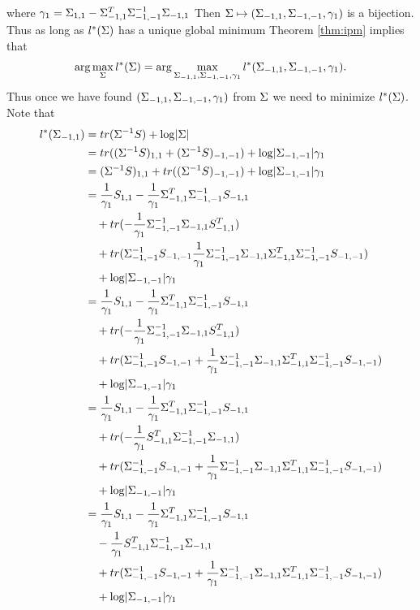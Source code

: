 \documentclass[12pt, leqno]{article}
\providecommand{\abs}[1]{\lvert#1\rvert}
\def\s{\ensuremath\Sigma}
\begin{document}
where $\gamma_1 = \s_{1,1} - \s_{-1,1}^T \s_{-1,-1}^{-1} \s_{-1,1}$
Then $\s \mapsto (\s_{-1,1},\s_{-1,-1},\gamma_1)$ is a bijection. Thus
as long as $l^*(\s)$ has a unique global minimum Theorem \ref{thm:ipm}
implies that 
\[
\arg\max_{\s} l^*(\s) = \arg\max_{\s_{-1,1},\s_{-1,-1},\gamma_1}
l^*(\s_{-1,1},\s_{-1,-1},\gamma_1).
\]
Thus once we have found $(\s_{-1,1},\s_{-1,-1},\gamma_1)$ from $\s$ we
need to minimize $l^*(\s)$. Note that 
\begin{align*}
l^*(\s_{-1,1}) &= tr(\s^{-1} S) + \log \abs{\s} \\
&= tr((\s^{-1} S)_{1,1} + (\s^{-1} S)_{-1,-1}) + \log \abs{\s_{-1,-1}}
  \gamma_1 \\
&= (\s^{-1} S)_{1,1} + tr((\s^{-1} S)_{-1,-1}) + \log \abs{\s_{-1,-1}}
  \gamma_1 \\
&= \frac{1}{\gamma_1} S_{1,1} -\frac{1}{\gamma_1} \s_{-1,1}^T \s_{-1,-1}^{-1}
  S_{-1,1} \\ 
&\quad + tr(-\frac{1}{\gamma_1} \s_{-1,-1}^{-1}
  \s_{-1,1} S_{-1,1}^T)\\ 
&\quad + tr( \s_{-1,-1}^{-1}S_{-1,-1}\frac{1}{\gamma_1} \s_{-1,-1}^{-1}
\s_{-1,1} \s_{-1,1}^T \s_{-1,-1}^{-1} S_{-1,-1} ) \\ 
&\quad + \log \abs{\s_{-1,-1}}
  \gamma_1 \\
&= \frac{1}{\gamma_1} S_{1,1} -\frac{1}{\gamma_1} \s_{-1,1}^T
  \s_{-1,-1}^{-1} S_{-1,1} \\ 
&\quad + tr(-\frac{1}{\gamma_1} \s_{-1,-1}^{-1}
  \s_{-1,1} S_{-1,1}^T) \\ 
&\quad + tr(\s_{-1,-1}^{-1}S_{-1,-1} + \frac{1}{\gamma_1} \s_{-1,-1}^{-1}
\s_{-1,1} \s_{-1,1}^T \s_{-1,-1}^{-1} S_{-1,-1} ) \\ 
&\quad + \log \abs{\s_{-1,-1}}
  \gamma_1 \\
&= \frac{1}{\gamma_1} S_{1,1} -\frac{1}{\gamma_1} \s_{-1,1}^T
  \s_{-1,-1}^{-1} S_{-1,1} \\ 
&\quad + tr(-\frac{1}{\gamma_1}
                                S_{-1,1}^T \s_{-1,-1}^{-1}
  \s_{-1,1}) \\ 
&\quad + tr(\s_{-1,-1}^{-1}S_{-1,-1} + \frac{1}{\gamma_1} \s_{-1,-1}^{-1}
\s_{-1,1} \s_{-1,1}^T \s_{-1,-1}^{-1} S_{-1,-1} ) \\ 
&\quad + \log \abs{\s_{-1,-1}}
  \gamma_1 \\
&= \frac{1}{\gamma_1} S_{1,1} -\frac{1}{\gamma_1} \s_{-1,1}^T
  \s_{-1,-1}^{-1} S_{-1,1} \\ 
&\quad -\frac{1}{\gamma_1}
                                S_{-1,1}^T \s_{-1,-1}^{-1}
  \s_{-1,1} \\ 
&\quad + tr(\s_{-1,-1}^{-1}S_{-1,-1} + \frac{1}{\gamma_1} \s_{-1,-1}^{-1}
\s_{-1,1} \s_{-1,1}^T \s_{-1,-1}^{-1} S_{-1,-1} ) \\ 
&\quad + \log \abs{\s_{-1,-1}}
  \gamma_1 
\end{align*}
\end{document}
